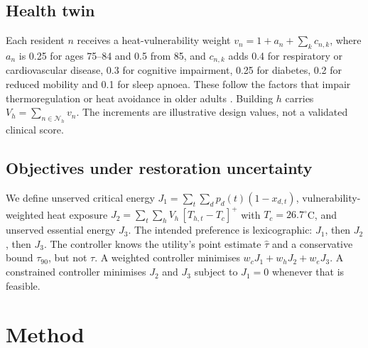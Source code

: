 \documentclass[conference]{IEEEtran}
\begin{document}
\subsection{Health twin}
Each resident $n$ receives a heat-vulnerability weight $v_n = 1 + a_n + \sum_{k} c_{n,k}$, where $a_n$ is 0.25 for ages 75--84 and 0.5 from 85, and $c_{n,k}$ adds 0.4 for respiratory or cardiovascular disease, 0.3 for cognitive impairment, 0.25 for diabetes, 0.2 for reduced mobility and 0.1 for sleep apnoea. These follow the factors that impair thermoregulation or heat avoidance in older adults \cite{kenny2010heat}. Building $h$ carries $V_h=\sum_{n\in\mathcal{N}_h} v_n$. The increments are illustrative design values, not a validated clinical score.

\subsection{Objectives under restoration uncertainty}
We define unserved critical energy $J_1=\sum_t\sum_d p_d(t)(1-x_{d,t})$, vulnerability-weighted heat exposure $J_2=\sum_t\sum_h V_h\,[T_{h,t}-T_c]^+$ with $T_c=26.7^\circ$C, and unserved essential energy $J_3$. The intended preference is lexicographic: $J_1$, then $J_2$, then $J_3$. The controller knows the utility's point estimate $\hat\tau$ and a conservative bound $\tau_{90}$, but not $\tau$. A weighted controller minimises $w_c J_1 + w_h J_2 + w_e J_3$. A constrained controller minimises $J_2$ and $J_3$ subject to $J_1=0$ whenever that is feasible.

\section{Method}
\end{document}
